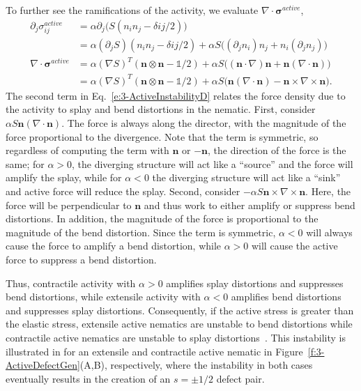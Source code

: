 To further see the ramifications of the activity, we evaluate $\nabla \cdot \bm{\sigma}^{active}$,
\begin{align}
  \partial_j \sigma^{active}_{ij} &= \alpha \partial_j \big(S(n_in_j - \delta{ij}/2)\big)\label{e:3-ActiveInstabilityA} \\
  &= \alpha(\partial_j S)(n_in_j - \delta{ij}/2) + \alpha S \big((\partial_j n_i)n_j + n_i(\partial_j n_j) \big) \\
  \nabla \cdot \bm{\sigma}^{active} &= \alpha (\nabla S)^T(\mathbf{n} \otimes \mathbf{n}-\mathbb{1}/2) + \alpha S \big((\mathbf{n} \cdot \nabla)\mathbf{n} + \mathbf{n}(\nabla \cdot \mathbf{n}) \big) \\
  &=  \alpha (\nabla S)^T(\mathbf{n} \otimes \mathbf{n}-\mathbb{1}/2) + \alpha S \big(\mathbf{n}(\nabla \cdot \mathbf{n}) - \mathbf{n} \times \nabla \times \mathbf{n}  \big).\label{e:3-ActiveInstabilityD}
\end{align}
The second term in Eq.~\ref{e:3-ActiveInstabilityD} relates the force density due to the activity to splay and bend distortions in the nematic.
First, consider $\alpha S \mathbf{n}(\nabla \cdot \mathbf{n})$.
The force is always along the director, with the magnitude of the force proportional to the divergence.
Note that the term is symmetric, so regardless of computing the term with $\mathbf{n}$ or $-\mathbf{n}$, the direction of the force is the same; for $\alpha > 0$, the diverging structure will act like a ``source'' and the force will amplify the splay, while for $\alpha < 0$ the diverging structure will act like a ``sink'' and active force will reduce the splay.
Second, consider $- \alpha S \mathbf{n} \times \nabla \times \mathbf{n}$. Here, the force will be perpendicular to $\mathbf{n}$ and thus work to either amplify or suppress bend distortions.
In addition, the magnitude of the force is proportional to the magnitude of the bend distortion.
Since the term is symmetric, $\alpha < 0$ will always cause the force to amplify a bend distortion, while $\alpha > 0$ will cause the active force to suppress a bend distortion.

Thus, contractile activity with $\alpha > 0$ amplifies splay distortions and suppresses bend distortions, while extensile activity with $\alpha < 0$ amplifies bend distortions and suppresses splay distortions.
Consequently, if the active stress is greater than the elastic stress,  extensile active nematics are unstable to bend distortions while contractile active nematics are unstable to splay distortions~\cite{RN171,RN170,RN11}.
This instability is illustrated in for an extensile and contractile active nematic in Figure~\ref{f:3-ActiveDefectGen}(A,B), respectively, where the instability in both cases eventually results in the creation of an $s=\pm 1/2$ defect pair.


